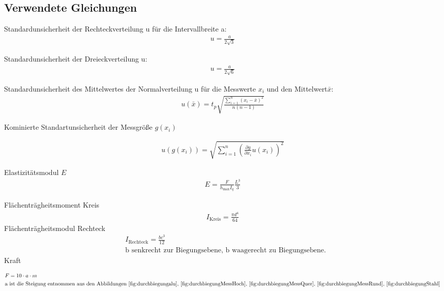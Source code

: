 

\subsection{Verwendete Gleichungen}\label{VGuD}







Standardunsicherheit der Rechteckverteilung u für die Intervallbreite a:
\begin{align}
	u=\frac{a}{2\sqrt{3}}\label{eq:sur}
	\end{align} 
	
	
Standardunsicherheit der Dreieckverteilung u: \begin{align}
	u=\frac{a}{2\sqrt{6}}\label{eq:sud}
\end{align}

Standardunsicherheit des Mittelwertes der Normalverteilung u für die Messwerte $x_i$ und den Mittelwert$\bar{x}$:
\begin{align}
	u(\bar{x})=  t_p  \sqrt{  \frac{\sum_{i=1}^{n}  (x_i-\bar{x})^2} {n (n-1)} }
	\label{eq:sunv}       
\end{align} 


Kominierte Standartunsicherheit der Messgröße $g(x_i)$

\begin{align}
	u(g(x_i))=   \sqrt{  \sum_{i=1}^{n} \left( \frac{\partial g}{\partial x_i} u(x_i) \right)^2  }
	\label{eq:kombsu}       
\end{align} 

Elastizitätsmodul $E$
\begin{align}
	E=\frac{F}{h_{\text{max}} I_q}\frac{L^3}{3}
	\label{eq:Elast}
\end{align}

Flächenträgheitsmoment Kreis
\begin{align}
	I_{\text{Kreis}}=\frac{\pi d^4}{64}
		\label{eq:TrägKreis}
\end{align}
Flächenträgheitsmodul Rechteck
\begin{align}		
	&I_{\text{Rechteck}}= \frac{bc^3}{12}\\
	\label{eq:TrägRecht}
	&\text{b senkrecht zur Biegungsebene, b waagerecht zu Biegungsebene.}
\end{align}
Kraft

\begin{align}
	&F=10 \cdot a \cdot m\\
	&\text{a ist die Steigung entnommen aus den Abbildungen \ref{fig:durchbiegungalu}, \ref{fig:durchbiegungMessHoch}, \ref{fig:durchbiegungMessQuer}, \ref{fig:durchbiegungMessRund}, \ref{fig:durchbiegungStahl}}
\end{align}




